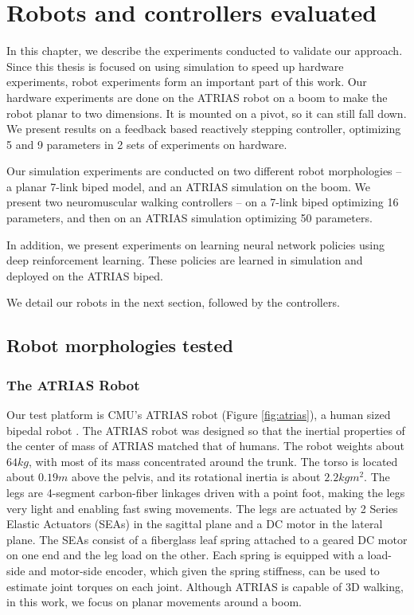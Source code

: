 \chapter{Robots and controllers evaluated}
\label{chap:robots}
In this chapter, we describe the experiments conducted to validate our approach. Since this thesis is focused on using simulation to speed up hardware experiments, robot experiments form an important part of this work. Our hardware experiments are done on the ATRIAS robot on a boom to make the robot planar to two dimensions. It is mounted on a pivot, so it can still fall down. We present results on a feedback based reactively stepping controller, optimizing 5 and 9 parameters in 2 sets of experiments on hardware. 

Our simulation experiments are conducted on two different robot morphologies -- a planar 7-link biped model, and an ATRIAS simulation on the boom. We present two neuromuscular walking controllers -- on a 7-link biped optimizing 16 parameters, and then on an ATRIAS simulation optimizing 50 parameters.

In addition, we present experiments on learning neural network policies using deep reinforcement learning. These policies are learned in simulation and deployed on the ATRIAS biped.

We detail our robots in the next section, followed by the controllers. 

\section{Robot morphologies tested}

\subsection{The ATRIAS Robot}
\label{sec:atrias}
Our test platform is CMU's ATRIAS robot (Figure \ref{fig:atrias}), a human sized bipedal robot \citep{hubicki2016atrias}. The ATRIAS robot was designed so that the inertial properties of the center of mass of ATRIAS matched that of humans. The robot weights about $64kg$, with most of its mass concentrated around the trunk. The torso is located about $0.19m$ above the pelvis, and its rotational inertia is about $2.2 kgm^2$. The legs are 4-segment carbon-fiber linkages driven with a point foot, making the legs very light and enabling fast swing movements. The legs are actuated by 2 Series Elastic Actuators (SEAs) in the sagittal plane and a DC motor in the lateral plane. The SEAs consist of a fiberglass leaf spring attached to a geared DC motor on one end and the leg load on the other. Each spring is equipped with a load-side and motor-side encoder, which given the spring stiffness, can be used to estimate joint torques on each joint. 
Although ATRIAS is capable of 3D walking, in this work, we focus on planar movements around a boom.

